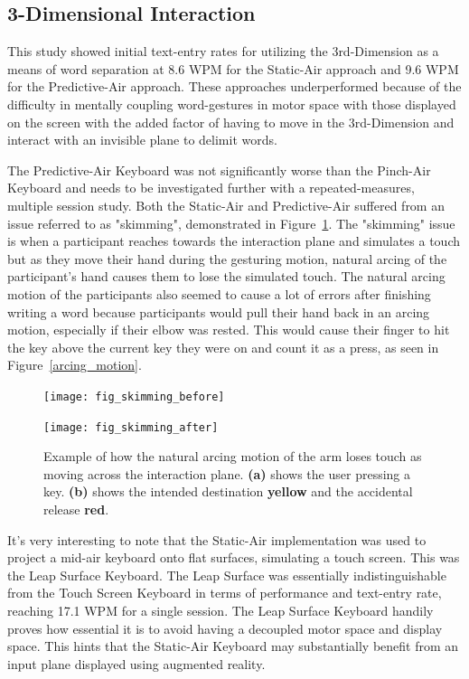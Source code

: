 \subsection{3-Dimensional Interaction}
This study showed initial text-entry rates for utilizing the 3rd-Dimension as a means of word separation at 8.6 WPM for the Static-Air approach and 9.6 WPM for the Predictive-Air approach. These approaches underperformed because of the difficulty in mentally coupling word-gestures in motor space with those displayed on the screen with the added factor of having to move in the 3rd-Dimension and interact with an invisible plane to delimit words.

The Predictive-Air Keyboard was not significantly worse than the Pinch-Air Keyboard and needs to be investigated further with a repeated-measures, multiple session study. Both the Static-Air and Predictive-Air suffered from an issue referred to as "skimming", demonstrated in Figure~\ref{skimming_problem}. The "skimming" issue is when a participant reaches towards the interaction plane and simulates a touch but as they move their hand during the gesturing motion, natural arcing of the participant's hand causes them to lose the simulated touch. The natural arcing motion of the participants also seemed to cause a lot of errors after finishing writing a word because participants would pull their hand back in an arcing motion, especially if their elbow was rested. This would cause their finger to hit the key above the current key they were on and count it as a press, as seen in Figure~\ref{arcing_motion}.

\begin{figure}[h]
	\centering
	\begin{minipage}[t]{2.5in}
		\texttt{[image: fig\_skimming\_before]}
	\end{minipage}
	\begin{minipage}[t]{2.5in}
		\texttt{[image: fig\_skimming\_after]}
	\end{minipage}
	\caption[Skimming Problem]{Example of how the natural arcing motion of the arm loses touch as moving across the interaction plane. \textbf{(a)} shows the user pressing a key. \textbf{(b)} shows the intended destination \textbf{yellow} and the accidental release \textbf{red}.}
	\label{skimming_problem}
\end{figure}

It's very interesting to note that the Static-Air implementation was used to project a mid-air keyboard onto flat surfaces, simulating a touch screen. This was the Leap Surface Keyboard. The Leap Surface was essentially indistinguishable from the Touch Screen Keyboard in terms of performance and text-entry rate, reaching 17.1 WPM for a single session. The Leap Surface Keyboard handily proves how essential it is to avoid having a decoupled motor space and display space. This hints that the Static-Air Keyboard may substantially benefit from an input plane displayed using augmented reality.

